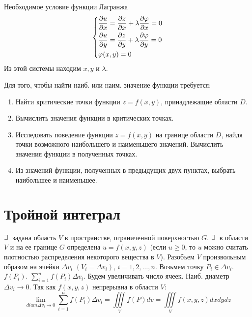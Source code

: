 \documentclass[a4paper,12pt,oneside]{extbook}
\def\lets{%
    \mathord{\setbox0=\hbox{$\exists$}%
        \hbox{\kern 0.125\wd0%
            \vbox to \ht0{%
                \hrule width 0.75\wd0%
                \vfill%
                \hrule width 0.75\wd0}%
            \vrule height \ht0%
            \kern 0.125\wd0}%
    }%
    \hspace{2pt}
}
\theoremstyle{numbered}
\theoremstyle{unnumbered}
\theoremstyle{named}
\theoremstyle{unnumbered}
\theoremstyle{named}
\theoremstyle{named}
\theoremstyle{named}
\begin{document}
Необходимое условие функции Лагранжа
\begin{equation}
    \begin{dcases*}
        \frac{\partial u}{\partial x} = \frac{\partial z}{\partial x} + \lambda \frac{\partial \varphi}{\partial x} = 0 \\
        \frac{\partial u}{\partial y} = \frac{\partial z}{\partial y} + \lambda \frac{\partial \varphi}{\partial y} = 0 \\
        \varphi(x, y) = 0
    \end{dcases*}
\end{equation}
Из этой системы находим \(x, y\) и \(\lambda\).

Для того, чтобы найти наиб. или наим. значение функции требуется:
\begin{enumerate}
    \item Найти критические точки функции \(z = f(x, y)\), принадлежащие области \(D\).
    \item Вычислить значения функции в критических точках.
    \item Исследовать поведение функции \(z = f(x, y)\) на границе области \(D\), найдя точки возможного наибольшего и наименьшего значений. Вычислить значения функции в полученных точках.
    \item Из значений функции, полученных в предыдущих двух пунктах, выбрать наибольшее и наименьшее.
\end{enumerate}



\chapter{Тройной интеграл}
\label{cha:Тройной интеграл}

\(\lets\) задана область \(V\) в пространстве, ограниченной поверхностью \(G\). \(\lets\) в области \(V\) и на ее границе \(G\) определена \(u = f(x, y, z)\) (если \(u \geq 0\), то \(u\) можно считать плотностью распределения некоторого вещества в \(V\)). Разобъем \(V\) произвольным образом на ячейки \(\Delta v_i\) \((V_i = \Delta v_i)\), \(i = 1, 2, \ldots, n\). Возьмем точку \(P_i \in \Delta v_i\). \(f(P_i)\). \(\sum_{i=1}^n f(P_i)\Delta v_i\). Будем увеличивать число ячеек. Наиб. диаметр \(\Delta v_i \to 0\). Так как \(f(x, y, z)\) непрерывна в области \(V\):
\begin{equation}
    \lim_{diam \Delta v_i \to 0}{\sum_{i = 1}^n f(P_i)\Delta v_i} = \iiint\limits_V f(P)dv = \iiint\limits_V f(x, y, z)dxdydz
\end{equation}
\end{document}
